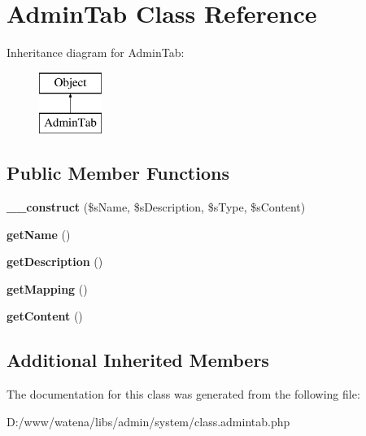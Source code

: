 \hypertarget{class_admin_tab}{\section{Admin\-Tab Class Reference}
\label{class_admin_tab}
}
Inheritance diagram for Admin\-Tab\-:\begin{figure}[H]
\begin{center}
\leavevmode
\includegraphics[height=2.000000cm]{class_admin_tab}
\end{center}
\end{figure}
\subsection*{Public Member Functions}
\begin{DoxyCompactItemize}
\item 
\hypertarget{class_admin_tab_afa13f0ace4f58c1e76524b8c43bc0639}{{\bfseries \-\_\-\-\_\-construct} (\$s\-Name, \$s\-Description, \$s\-Type, \$s\-Content)}\label{class_admin_tab_afa13f0ace4f58c1e76524b8c43bc0639}

\item 
\hypertarget{class_admin_tab_a2912a031b390d6fa684a12a5b05676ea}{{\bfseries get\-Name} ()}\label{class_admin_tab_a2912a031b390d6fa684a12a5b05676ea}

\item 
\hypertarget{class_admin_tab_aefc4bb2efc1aaf342e39416a64aea73e}{{\bfseries get\-Description} ()}\label{class_admin_tab_aefc4bb2efc1aaf342e39416a64aea73e}

\item 
\hypertarget{class_admin_tab_a9faf49f0a4f713af9c70af35d98a569d}{{\bfseries get\-Mapping} ()}\label{class_admin_tab_a9faf49f0a4f713af9c70af35d98a569d}

\item 
\hypertarget{class_admin_tab_a6fae5e75f911f623456ff1c03eaeabfd}{{\bfseries get\-Content} ()}\label{class_admin_tab_a6fae5e75f911f623456ff1c03eaeabfd}

\end{DoxyCompactItemize}
\subsection*{Additional Inherited Members}


The documentation for this class was generated from the following file\-:\begin{DoxyCompactItemize}
\item 
D\-:/www/watena/libs/admin/system/class.\-admintab.\-php\end{DoxyCompactItemize}
